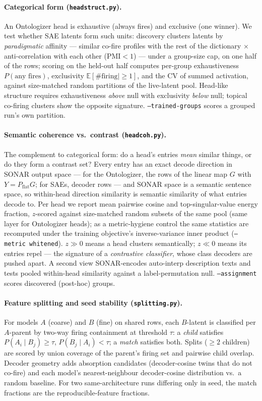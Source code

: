 \documentclass[11pt]{article}
\begin{document}
\paragraph{Categorical form (\texttt{headstruct.py}).}
An Ontologizer head is exhaustive (always fires) and exclusive (one
winner). We test whether SAE latents form such units: discovery clusters
latents by \emph{paradigmatic} affinity --- similar co-fire profiles with
the rest of the dictionary $\times$ anti-correlation with each other
(PMI${}<1$) --- under a group-size cap, on one half of the rows; scoring
on the held-out half computes per-group exhaustiveness $P(\text{any
fires})$, exclusivity $\mathbb{E}[\#\text{firing} \mid \geq 1]$, and the
CV of summed activation, against size-matched random partitions of the
live-latent pool. Head-like structure requires exhaustiveness \emph{above}
null with exclusivity \emph{below} null; topical co-firing clusters show
the opposite signature. \texttt{--trained-groups} scores a grouped run's
own partition.

\paragraph{Semantic coherence vs.\ contrast (\texttt{headcoh.py}).}
The complement to categorical form: do a head's entries \emph{mean}
similar things, or do they form a contrast set? Every entry has an exact
decode direction in SONAR output space --- for the Ontologizer, the rows
of the linear map $G$ with $Y = P_{\text{flat}}G$; for SAEs, decoder rows
--- and SONAR space is a semantic sentence space, so within-head direction
similarity is semantic similarity of what entries decode to. Per head we
report mean pairwise cosine and top-singular-value energy fraction,
$z$-scored against size-matched random subsets of the same pool (same
layer for Ontologizer heads); as a metric-hygiene control the same
statistics are recomputed under the training objective's inverse-variance
inner product (\texttt{--metric whitened}). $z \gg 0$ means a head clusters
semantically; $z \ll 0$ means its entries repel --- the signature of a
\emph{contrastive classifier}, whose class decoders are pushed apart. A
second view SONAR-encodes auto-interp description texts and tests pooled
within-head similarity against a label-permutation null.
\texttt{--assignment} scores discovered (post-hoc) groups.

\paragraph{Feature splitting and seed stability (\texttt{splitting.py}).}
For models $A$ (coarse) and $B$ (fine) on shared rows, each $B$-latent is
classified per $A$-parent by two-way firing containment at threshold
$\tau$: a \emph{child} satisfies $P(A_i \mid B_j) \geq \tau$,
$P(B_j \mid A_i) < \tau$; a \emph{match} satisfies both. Splits
($\geq 2$ children) are scored by union coverage of the parent's firing
set and pairwise child overlap. Decoder geometry adds absorption
candidates (decoder-cosine twins that do not co-fire) and each model's
nearest-neighbour decoder-cosine distribution vs.\ a random baseline. For
two same-architecture runs differing only in seed, the match fractions
are the reproducible-feature fractions.
\end{document}
